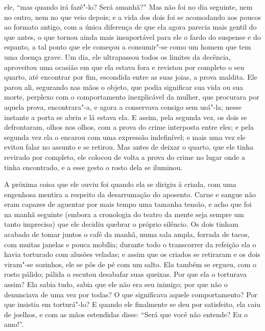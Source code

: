 ele, “mas quando irá fazê"-lo?  Será amanhã?”  Mas não foi no dia
seguinte, nem no outro, nem no que veio depois; e a vida dos dois foi
se acomodando aos poucos ao formato antigo, com a única diferença de
que ela agora parecia mais gentil do que antes, o que tornou ainda mais
insuportável para ele o fardo do suspense e do espanto, a tal ponto que
ele começou a consumir"-se como um homem que tem uma doença grave.  Um
dia, ele ultrapassou todos os limites da decência, aproveitou uma
ocasião em que ela estava fora e revistou por completo o seu quarto,
até encontrar por fim, escondida entre as suas joias, a prova maldita. 
Ele parou ali, segurando nas mãos o objeto, que podia significar sua
vida ou sua morte, perplexo com o comportamento inexplicável da
mulher, que procurara por aquela prova, encontrara"-a, e agora a
conservava consigo sem usá"-la; nesse instante a porta se abriu e
lá estava ela.  E assim, pela segunda vez, os dois se defrontaram,
olhos nos olhos, com a prova do crime interposta entre eles; e pela
segunda vez ela o encarou com uma expressão indefinível; e mais uma vez
ele evitou falar no assunto e se retirou.  Mas antes de deixar o
quarto, que ele tinha revirado por completo, ele colocou de volta a
prova do crime no lugar onde a tinha encontrado, e a esse gesto o rosto
dela se iluminou.

A próxima coisa que ele ouviu foi quando ela se dirigiu à criada, com
uma engenhosa mentira a respeito da desarrumação do aposento.  Carne e
sangue não eram capazes de aguentar por mais tempo uma tamanha tensão,
e acho que foi na manhã seguinte (embora a cronologia do teatro da
mente seja sempre um tanto imprecisa)  que ele decidiu quebrar o
próprio silêncio.  Os dois tinham acabado de tomar juntos o café da
manhã, numa sala ampla, forrada de tacos, com muitas janelas e pouca
mobília; durante todo o transcorrer da refeição ela o havia torturado
com alusões veladas; e assim que os criados se retiraram e os dois
viram"-se sozinhos, ele se pôs de pé com um salto.  Ela também se
ergueu, com o rosto pálido;  pálida o escutou desabafar suas queixas.
Por que ela o torturava assim?  Ela sabia tudo, sabia que ele
não era seu inimigo; por que não o denunciava de uma vez por todas?  O
que significava aquele comportamento?  Por que insistia em torturá"-lo? 
E quando ele finalmente se deu por satisfeito, ela caiu de joelhos, e
com as mãos estendidas disse: “Será que você não entende?  Eu o amo!”.

